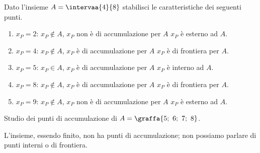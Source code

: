 \begin{esempio}
Dato l'insieme \(A = \intervaa{4}{8}\) 
stabilisci le caratteristiche dei seguenti punti.
\begin{enumerate} [label=\alph*)]
\item \(x_P= 2\): \quad  \(x_P \notin A\), 
\(x_P\) non è di accumulazione per \(A\) \(x_P\) è esterno ad \(A\).
\item \(x_P= 4\): \quad  \(x_P \notin A\), 
\(x_P\) è di accumulazione per \(A\) \(x_P\) è di frontiera per \(A\).
\item \(x_P= 5\): \quad  \(x_P \in A\), 
\(x_P\) è di accumulazione per \(A\) \(x_P\) è interno ad \(A\).
\item \(x_P= 8\): \quad  \(x_P \notin A\), 
\(x_P\) è di accumulazione per \(A\) \(x_P\) è di frontiera per \(A\).
\item \(x_P= 9\): \quad  \(x_P \notin A\), 
\(x_P\) non è di accumulazione per \(A\) \(x_P\) è esterno ad \(A\).
\end{enumerate}
\end{esempio}

\begin{esempio}
Studio dei punti di accumulazione di \(A=\graffa{5;~6;~7;~8}\).

L'insieme, essendo finito, non ha punti di accumulazione; 
non possiamo parlare di punti interni o di frontiera.
\end{esempio}

